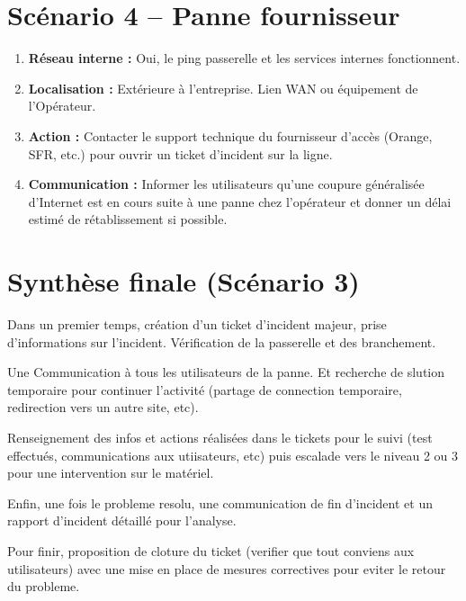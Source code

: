 \documentclass[12pt,a4paper]{article}
\begin{document}
\section*{Scénario 4 -- Panne fournisseur}
\begin{enumerate}
    \item \textbf{Réseau interne :} Oui, le ping passerelle et les services internes fonctionnent.
    \item \textbf{Localisation :} Extérieure à l'entreprise. Lien WAN ou équipement de l'Opérateur.
    \item \textbf{Action :} Contacter le support technique du fournisseur d'accès (Orange, SFR, etc.) pour ouvrir un ticket d'incident sur la ligne.
    \item \textbf{Communication :} Informer les utilisateurs qu'une coupure généralisée d'Internet est en cours suite à une panne chez l'opérateur et donner un délai estimé de rétablissement si possible.
\end{enumerate}
\section*{Synthèse finale (Scénario 3)}
\vspace{0.5cm}

\noindent Dans un premier temps, création d'un ticket d'incident majeur, prise d'informations sur l'incident. Vérification de la passerelle et des branchement. 
\vspace{0.3cm}

\noindent Une Communication à tous les utilisateurs de la panne. Et recherche de slution temporaire pour continuer l'activité (partage de connection temporaire, redirection vers un autre site, etc).
\vspace{0.3cm}

\noindent Renseignement des infos et actions réalisées dans le tickets pour le suivi (test effectués, communications aux utiisateurs, etc) puis escalade vers le niveau 2 ou 3 pour une intervention sur le matériel.
\vspace{0.3cm}

\noindent Enfin, une fois le probleme resolu, une communication de fin d'incident et un rapport d'incident détaillé pour l'analyse.
\vspace{0.3cm}

\noindent Pour finir, proposition de cloture du ticket (verifier que tout conviens aux utilisateurs) avec une mise en place de mesures correctives pour eviter le retour du probleme.
\end{document}
